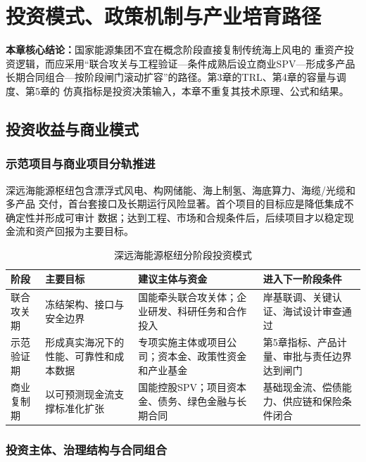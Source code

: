 \chapter{投资模式、政策机制与产业培育路径}

\noindent\textbf{本章核心结论：}国家能源集团不宜在概念阶段直接复制传统海上风电的
重资产投资逻辑，而应采用“联合攻关与工程验证—条件成熟后设立商业SPV—形成多产品
长期合同组合—按阶段闸门滚动扩容”的路径。第3章的TRL、第4章的容量与调度、第5章的
仿真指标是投资决策输入，本章不重复其技术原理、公式和结果。

\section{投资收益与商业模式}

\subsection{示范项目与商业项目分轨推进}

深远海能源枢纽包含漂浮式风电、构网储能、海上制氢、海底算力、海缆/光缆和多产品
交付，首台套接口及长期运行风险显著。首个项目的目标应是降低集成不确定性并形成可审计
数据；达到工程、市场和合规条件后，后续项目才以稳定现金流和资产回报为主要目标。

\begin{table}[H]
\centering
\caption{深远海能源枢纽分阶段投资模式}
\label{tab:c6-investment-stages}
\begin{tabularx}{\textwidth}{p{2.4cm} X X X}
\toprule
阶段 & 主要目标 & 建议主体与资金 & 进入下一阶段条件\\
\midrule
联合攻关期 & 冻结架构、接口与安全边界 & 国能牵头联合攻关体；企业研发、科研任务和合作投入 & 岸基联调、关键认证、海试设计审查通过\\
示范验证期 & 形成真实海况下的性能、可靠性和成本数据 & 专项实施主体或项目公司；资本金、政策性资金和产业基金 & 第5章指标、产品计量、审批与责任边界达到闸门\\
商业复制期 & 以可预测现金流支撑标准化扩张 & 国能控股SPV；项目资本金、债务、绿色金融与长期合同 & 基础现金流、偿债能力、供应链和保险条件闭合\\
\bottomrule
\end{tabularx}
\end{table}

\subsection{投资主体、治理结构与合同组合}

